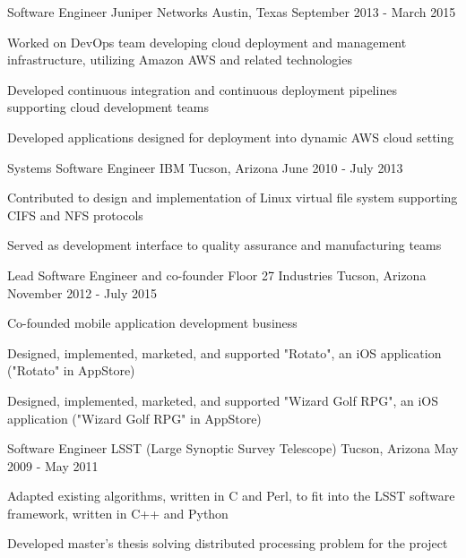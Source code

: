 \begin{cventries}
  \cventry
    {Software Engineer}
    {Juniper Networks} %
    {Austin, Texas}
    {September 2013 - March 2015} %
    {
      \begin{cvitems} %
        \item {Worked on DevOps team developing cloud deployment and management infrastructure, utilizing Amazon AWS and related technologies}
        \item {Developed continuous integration and continuous deployment pipelines supporting cloud development teams}
        \item {Developed applications designed for deployment into dynamic AWS cloud setting}
      \end{cvitems}
    }

  \cventry
    {Systems Software Engineer}
    {IBM}
    {Tucson, Arizona}
    {June 2010 - July 2013} %
    {
      \begin{cvitems} %
        \item {Contributed to design and implementation of Linux virtual file system supporting CIFS and NFS protocols}
        \item {Served as development interface to quality assurance and manufacturing teams}
      \end{cvitems}
    }

  \cventry
    {Lead Software Engineer and co-founder}
    {Floor 27 Industries}
    {Tucson, Arizona}
    {November 2012 - July 2015} %
    {
      \begin{cvitems} %
        \item {Co-founded mobile application development business}
        \item {Designed, implemented, marketed, and supported "Rotato", an iOS application ("Rotato" in AppStore)}
        \item {Designed, implemented, marketed, and supported "Wizard Golf RPG", an iOS application ("Wizard Golf RPG" in AppStore)}
      \end{cvitems}
    }

  \cventry
    {Software Engineer} %
    {LSST (Large Synoptic Survey Telescope)}
    {Tucson, Arizona}
    {May 2009 - May 2011} %
    {
      \begin{cvitems} %
        \item {Adapted existing algorithms, written in C and Perl, to fit into the LSST software framework, written in C++ and Python}
        \item {Developed master's thesis solving distributed processing problem for the project}
      \end{cvitems}
    }


\end{cventries}
